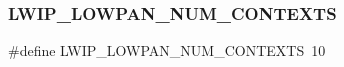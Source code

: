 \subsubsection{\texorpdfstring{L\+W\+I\+P\+\_\+L\+O\+W\+P\+A\+N\+\_\+\+N\+U\+M\+\_\+\+C\+O\+N\+T\+E\+X\+TS}{LWIP\_6LOWPAN\_NUM\_CONTEXTS}}
{\footnotesize\ttfamily \#define L\+W\+I\+P\+\_\+L\+O\+W\+P\+A\+N\+\_\+\+N\+U\+M\+\_\+\+C\+O\+N\+T\+E\+X\+TS~10}

